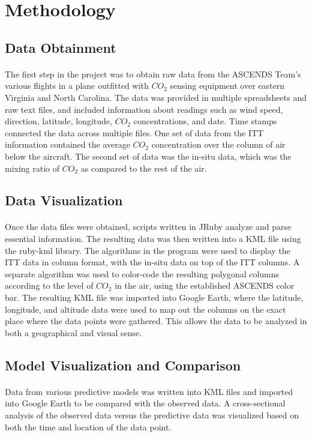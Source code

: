 \documentclass[12pt,letterpaper]{report}
\begin{document}
 \section*{Methodology}
  \subsection*{Data Obtainment}
   \paragraph{}
    The first step in the project was to obtain raw data from the ASCENDS Team's various flights in a plane outfitted with $CO_2$ sensing equipment over eastern Virginia and North Carolina.  The data was provided in multiple spreadsheets and raw text files, and included information about readings such as wind speed, direction, latitude, longitude, $CO_2$ concentrations, and date. Time stamps connected the data across multiple files. One set of data from the ITT information contained the average $CO_2$ concentration over the column of air below the aircraft. The second set of data was the in-situ data, which was the mixing ratio of $CO_2$ as compared to the rest of the air.
  \subsection*{Data Visualization}
   \paragraph{}
    Once the data files were obtained, scripts written in JRuby analyze and parse essential information. The resulting data was then written into a KML file using the ruby-kml library. The algorithms in the program were used to display the ITT data in column format, with the in-situ data on top of the ITT columns. A separate algorithm was used to color-code the resulting polygonal columns according to the level of $CO_2$ in the air, using the established ASCENDS color bar. The resulting KML file was imported into Google Earth, where the latitude, longitude, and altitude data were used to map out the columns on the exact place where the data points were gathered. This allows the data to be analyzed in both a geographical and visual sense.
  \subsection*{Model Visualization and Comparison}
   \paragraph{}
    Data from various predictive models was written into KML files and imported into Google Earth to be compared with the observed data. A cross-sectional analysis of the observed data versus the predictive data was visualized based on both the time and location of the data point.
\end{document}

